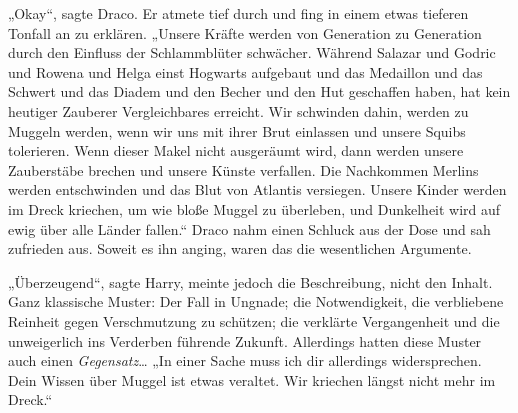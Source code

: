„Okay“, sagte Draco. Er atmete tief durch und fing in einem etwas tieferen Tonfall an zu erklären. „Unsere Kräfte werden von Generation zu Generation durch den Einfluss der Schlammblüter schwächer. Während Salazar und Godric und Rowena und Helga einst Hogwarts aufgebaut und das Medaillon und das Schwert und das Diadem und den Becher und den Hut geschaffen haben, hat kein heutiger Zauberer Vergleichbares erreicht. Wir schwinden dahin, werden zu Muggeln werden, wenn wir uns mit ihrer Brut einlassen und unsere Squibs tolerieren. Wenn dieser Makel nicht ausgeräumt wird, dann werden unsere Zauberstäbe brechen und unsere Künste verfallen. Die Nachkommen Merlins werden entschwinden und das Blut von Atlantis versiegen. Unsere Kinder werden im Dreck kriechen, um wie bloße Muggel zu überleben, und Dunkelheit wird auf ewig über alle Länder fallen.“ Draco nahm einen Schluck aus der Dose und sah zufrieden aus. Soweit es ihn anging, waren das die wesentlichen Argumente.

„Überzeugend“, sagte Harry, meinte jedoch die Beschreibung, nicht den Inhalt. Ganz klassische Muster: Der Fall in Ungnade; die Notwendigkeit, die verbliebene Reinheit gegen Verschmutzung zu schützen; die verklärte Vergangenheit und die unweigerlich ins Verderben führende Zukunft. Allerdings hatten diese Muster auch einen \emph{Gegensatz}… „In einer Sache muss ich dir allerdings widersprechen. Dein Wissen über Muggel ist etwas veraltet. Wir kriechen längst nicht mehr im Dreck.“

